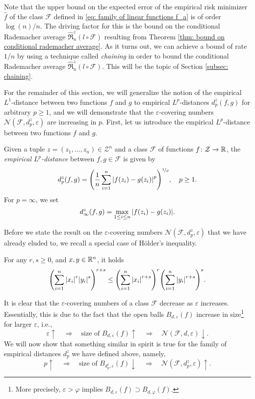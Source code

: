Note that the upper bound on the expected error of the empirical risk minimizer $\hat{f}$ of the class $\mathcal{F}$ defined in \eqref{eq: family of linear functions f_a} is of order $\log(n) / n$. The driving factor for this is the bound on the conditional Rademacher average $\hat{\mathfrak{R}}_n^z(l \circ \mathcal{F})$ resulting from Theorem \ref{thm: bound on conditional rademacher average}. As it turns out, we can achieve a bound of rate $1 / n$ by using a technique called \emph{chaining} in order to bound the conditional Rademacher average $\hat{\mathfrak{R}}_n^z(l \circ \mathcal{F})$. This will be the topic of Section \ref{subsec: chaining}.

For the remainder of this section, we will generalize the notion of the empirical $L^1$-distance between two functions $f$ and $g$ to empirical $L^p$-distances $d_p^z(f, g)$ for arbitrary $p \geq 1$, and we will demonstrate that the $\varepsilon$-covering numbers $\mathcal{N}(\mathcal{F}, d_p^z, \varepsilon)$ are increasing in $p$. First, let us introduce the empirical $L^p$-distance between two functions $f$ and $g$.

\begin{definition}
Given a tuple $z = (z_1, \dots, z_n) \in \mathcal{Z}^n$ and a class $\mathcal{F}$ of functions $f \colon \mathcal{Z} \to \mathbb{R}$, the \emph{empirical $L^p$-distance} between $f, g \in \mathcal{F}$ is given by
\[
    d_p^z(f, g) = \left(\frac{1}{n} \sum_{i=1}^n \abs{f(z_i) - g(z_i)}^p \right)^{\nicefrac{1}{p}}, \quad p \geq 1.
\]
For $p = \infty$, we set
\[
    d_{\infty}^z(f, g) = \max_{1 \leq i \leq n} \abs{f(z_i) - g(z_i)}.
\]
\end{definition}

Before we state the result on the $\varepsilon$-covering numbers $\mathcal{N}(\mathcal{F}, d_p^z, \varepsilon)$ that we have already eluded to, we recall a special case of H{\"o}lder's inequality.

\begin{proposition}[H{\"o}lder, 1889]
\label{prop: hoelder}
For any $r, s \geq 0$, and $x, y \in \mathbb{R}^n$, it holds
\[
    \left(\sum_{i=1}^n \abs{x_i}^r \abs{y_i}^s \right)^{r+s} \leq \left(\sum_{i=1}^n \abs{x_i}^{r+s}\right)^r \left(\sum_{i=1}^n \abs{y_i}^{r+s}\right)^s.
\]
\end{proposition}

It is clear that the $\varepsilon$-covering numbers of a class $\mathcal{F}$ decrease as $\varepsilon$ increases. Essentially, this is due to the fact that the open balls $B_{d, \varepsilon}(f)$ increase in size\footnote{More precisely, $\varepsilon > \varphi$ implies $B_{d, \varepsilon}(f) \supset B_{d, \varphi}(f)$.} for larger $\varepsilon$, i.e.,
\[
    \varepsilon \uparrow \quad \Rightarrow \quad \text{size of } B_{d, \varepsilon}(f) \uparrow \quad \Rightarrow \quad \mathcal{N}(\mathcal{F}, d, \varepsilon) \downarrow.
\]
We will now show that something similar in spirit is true for the family of empirical distances $d_p^z$ we have defined above, namely,
\[
    p \uparrow \quad \Rightarrow \quad \text{size of } B_{d_p^z, \varepsilon}(f) \downarrow \quad \Rightarrow \quad \mathcal{N}(\mathcal{F}, d_p^z, \varepsilon) \uparrow.
\]

